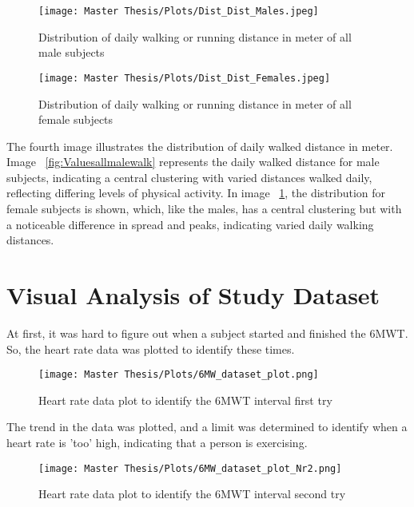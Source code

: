 \FloatBarrier
\begin{figure}[h!]
  \centering
  \begin{minipage}[b]{0.7\linewidth}
    \texttt{[image: Master Thesis/Plots/Dist\_Dist\_Males.jpeg]}
    \caption{Distribution of daily walking or running distance in meter of all male subjects}
    \label{fig:Valuesallmalewalk}
  \end{minipage}%
  \quad
  \begin{minipage}[b]{0.7\linewidth}
    \texttt{[image: Master Thesis/Plots/Dist\_Dist\_Females.jpeg]}
    \caption{Distribution of daily walking or running distance in meter of all female subjects}
    \label{fig:Valuesallfemalewalk}
  \end{minipage}
\end{figure}
\FloatBarrier

The fourth image illustrates the distribution of daily walked distance in meter. Image ~\ref{fig:Valuesallmalewalk} represents the daily walked distance for male subjects, indicating a central clustering with varied distances walked daily, reflecting differing levels of physical activity. In image ~\ref{fig:Valuesallfemalewalk}, the distribution for female subjects is shown, which, like the males, has a central clustering but with a noticeable difference in spread and peaks, indicating varied daily walking distances.

\section{Visual Analysis of Study Dataset}

At first, it was hard to figure out when a subject started and finished the 6MWT. So, the heart rate data was plotted to identify these times.

\FloatBarrier
\begin{figure}[h!]
  \centering
  \texttt{[image: Master Thesis/Plots/6MW\_dataset\_plot.png]}
    \caption{Heart rate data plot to identify the 6MWT interval first try}
    \label{fig:6MW-study1}
\end{figure}
\FloatBarrier
The trend in the data was plotted, and a limit was determined to identify when a heart rate is 'too' high, indicating that a person is exercising.

\FloatBarrier
\begin{figure}[h!]
    \centering
    \texttt{[image: Master Thesis/Plots/6MW\_dataset\_plot\_Nr2.png]}
    \caption{Heart rate data plot to identify the 6MWT interval second try}
    \label{fig:6MW-study2}
\end{figure}
\FloatBarrier

